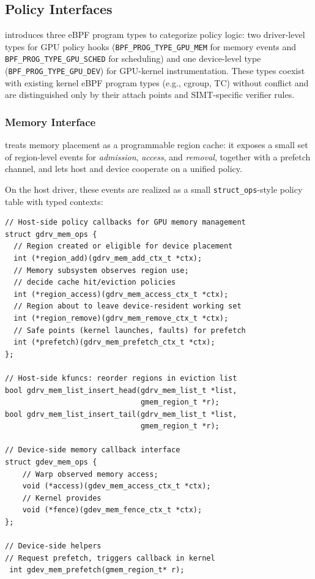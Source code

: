 \subsection{Policy Interfaces}
\label{sec:design-interfaces}

\sys introduces three eBPF program types to categorize policy logic:
two driver-level types for GPU policy hooks (\texttt{BPF\_PROG\_TYPE\_GPU\_MEM} for memory events and \texttt{BPF\_PROG\_TYPE\_GPU\_SCHED} for scheduling) and one device-level type (\texttt{BPF\_PROG\_TYPE\_GPU\_DEV}) for GPU-kernel instrumentation. These types coexist with existing kernel eBPF program types (e.g., cgroup, TC) without conflict and are distinguished only by their attach points and SIMT-specific verifier rules.

\subsubsection{Memory Interface}
\label{sec:design-mem}

\sys treats memory placement as a programmable region
cache: it exposes a small set of region-level events for \emph{admission},
\emph{access}, and \emph{removal}, together with a prefetch channel, and lets host
and device cooperate on a unified policy.

On the host driver, these events are realized as a small \texttt{struct\_ops}-style policy
table with typed contexts:




\begin{verbatim}
// Host-side policy callbacks for GPU memory management
struct gdrv_mem_ops {
  // Region created or eligible for device placement
  int (*region_add)(gdrv_mem_add_ctx_t *ctx);
  // Memory subsystem observes region use;
  // decide cache hit/eviction policies
  int (*region_access)(gdrv_mem_access_ctx_t *ctx);
  // Region about to leave device-resident working set
  int (*region_remove)(gdrv_mem_remove_ctx_t *ctx);
  // Safe points (kernel launches, faults) for prefetch
  int (*prefetch)(gdrv_mem_prefetch_ctx_t *ctx);
};

// Host-side kfuncs: reorder regions in eviction list
bool gdrv_mem_list_insert_head(gdrv_mem_list_t *list,
                               gmem_region_t *r);
bool gdrv_mem_list_insert_tail(gdrv_mem_list_t *list,
                               gmem_region_t *r);

// Device-side memory callback interface
struct gdev_mem_ops {
    // Warp observed memory access;
    void (*access)(gdev_mem_access_ctx_t *ctx);
    // Kernel provides
    void (*fence)(gdev_mem_fence_ctx_t *ctx);
};

// Device-side helpers
// Request prefetch, triggers callback in kernel
 int gdev_mem_prefetch(gmem_region_t* r);
\end{verbatim}

